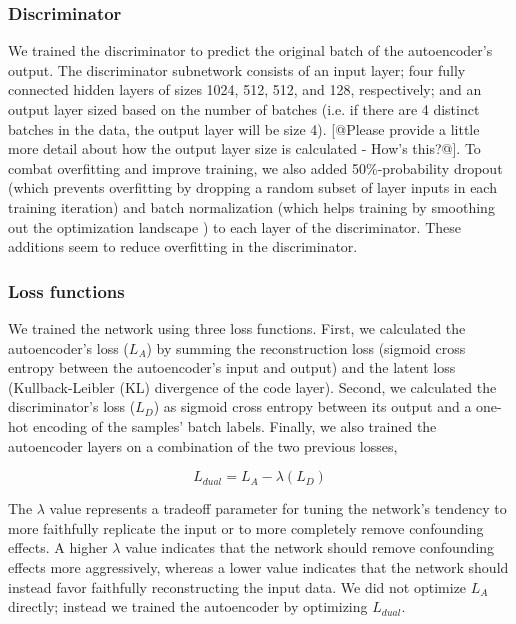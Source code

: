 \documentclass[11pt]{article}
\begin{document}
\subsubsection{Discriminator}

We trained the discriminator to predict the original batch of the autoencoder's output.
The discriminator subnetwork consists of an input layer; four fully connected hidden layers of sizes 1024, 512, 512, and 128, respectively; and an output layer sized based on the number of batches (i.e. if there are 4 distinct batches in the data, the output layer will be size 4). [@Please provide a little more detail about how the output layer size is calculated - How's this?@].
To combat overfitting and improve training, we also added 50\%-probability dropout \cite{srivastava_dropout_2014} (which prevents overfitting by dropping a random subset of layer inputs in each training iteration) and batch normalization \cite{ioffe_batch_2015} (which helps training by smoothing out the optimization landscape \citep{santurkar_how_2018}) to each layer of the discriminator.
These additions seem to reduce overfitting in the discriminator.

\subsubsection{Loss functions}

We trained the network using three loss functions.
First, we calculated the autoencoder's loss ($L_A$) by summing the reconstruction loss (sigmoid cross entropy between the autoencoder's input and output) and the latent loss (Kullback-Leibler (KL) divergence \cite{kullback_information_1951} of the code layer).
Second, we calculated the discriminator's loss ($L_D$) as sigmoid cross entropy between its output and a one-hot encoding of the samples' batch labels.
Finally, we also trained the autoencoder layers on a combination of the two previous losses,

\begin{equation}
	\label{dual_loss}
	L_{dual} = L_A - \lambda{}(L_D)
\end{equation}

The $\lambda$ value represents a tradeoff parameter for tuning the network's tendency to more faithfully replicate the input or to more completely remove confounding effects.
A higher $\lambda$ value indicates that the network should remove confounding effects more aggressively, whereas a lower value indicates that the network should instead favor faithfully reconstructing the input data.
We did not optimize $L_A$ directly; instead we trained the autoencoder by optimizing $L_{dual}$.
\end{document}
